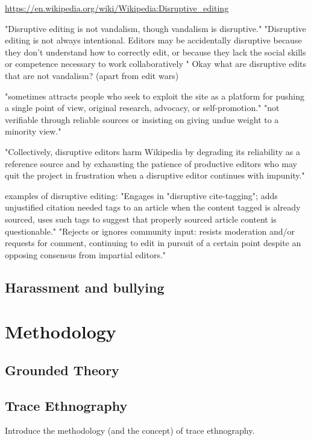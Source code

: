 \documentclass{sigchi}
\begin{document}
\url{https://en.wikipedia.org/wiki/Wikipedia:Disruptive_editing}

"Disruptive editing is not vandalism, though vandalism is disruptive."
"Disruptive editing is not always intentional. Editors may be accidentally disruptive because they don't understand how to correctly edit, or because they lack the social skills or competence necessary to work collaboratively "
Okay what are disruptive edits that are not vandalism? (apart from edit wars)

"sometimes attracts people who seek to exploit the site as a platform for pushing a single point of view, original research, advocacy, or self-promotion."
"not verifiable through reliable sources or insisting on giving undue weight to a minority view."

"Collectively, disruptive editors harm Wikipedia by degrading its reliability as a reference source and by exhausting the patience of productive editors who may quit the project in frustration when a disruptive editor continues with impunity."

examples of disruptive editing:
"Engages in "disruptive cite-tagging"; adds unjustified {{citation needed}} tags to an article when the content tagged is already sourced, uses such tags to suggest that properly sourced article content is questionable."
"Rejects or ignores community input: resists moderation and/or requests for comment, continuing to edit in pursuit of a certain point despite an opposing consensus from impartial editors."

\subsection{Harassment and bullying}


\section{Methodology}

\subsection{Grounded Theory}
\subsection{Trace Ethnography}

\cite{GeiRib2011}
Introduce the methodology (and the concept) of trace ethnography.
\end{document}
